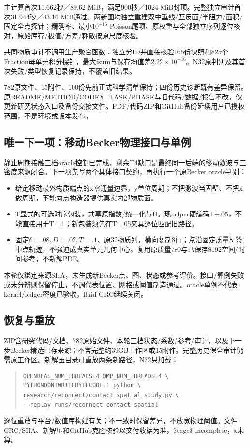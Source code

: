 \documentclass[11pt,a4paper]{article}
\begin{document}
主计算首次11.662秒／89.62 MiB，满足900秒／1024 MiB封顶。完整独立审计首次31.944秒／83.16 MiB通过。两新图均独立重建双中垂线/互反面/半阻力/面积/固定全点探针；精确率、最小$10^{-16}$ Poisson尾项、原权重与全部独立序列逐位核对，原始库存/极值/方差/耗散按原尺度核验。

共同物质审计不调用生产聚合函数：独立分ID并直接核验165份快照和825个Fraction母单元积分探针，最大fsum与保存均值差$2.22\times10^{-16}$。N32原判别及其首次失败/类型恢复记录保持，不覆盖旧结果。

782原文件、15附件、100份先前正式科学清单保持；四份历史诊断既有差异保留。原README/METHOD/CODEX\_TASK/PHASE与旧代码/数据/报告不改，仅更新研究状态入口及备份交接文件。PDF/代码ZIP和GitHub备份延续用户已授权范围，不是环境或版本发布。

\subsection*{唯一下一项：移动Becker物理接口与单例}
静止周期接触三档oracle控制已完成，剩余T4缺口是最终同一后端的移动激波与三密度来源闭合。下一项先写两个具体接口契约，再执行一个原Becker oracle判别：
\begin{itemize}
\item 给定移动最外物质端点的x零通量边界，y单位周期；不把激波当固壁、不把x做周期，不能向点构造器提供真实内部物质面。
\item T显式的可选时序包装，共享原指数/统一化与H。现helper硬编码T=.05，不能直接用于T=.1；新包装须先在T=.05夹具逐位匹配旧路径。
\item 固定$\delta=.08,D=.02,T=.1$、原32物质列，横向复制8行；点沿固定质量标签中点轨迹，不强迫成真实单元几何中心。复用原质量/c0与已保存8192空间/时间参考，不新解PDE。
\end{itemize}
本轮仅绑定来源SHA，未生成新Becker点、图、状态或参考评价。接口/算例失败或未分辨则保留停止，不调代表位置、网格或阈值制造通过。oracle单例不代表kernel/ledger密度已验收，fluid ORC继续关闭。

\subsection*{恢复与重放}
ZIP含研究代码/文档、782原始文件、本轮三档状态/系数/参考/审计，以及下一步Becker精选已存来源；不含完整约39GB工作区或15附件。完整历史保全审计仍需原工作区。新解压目录可重放两条新路径，N32只加载：
\begin{quote}\small\begin{verbatim}
OPENBLAS_NUM_THREADS=4 OMP_NUM_THREADS=4 \
PYTHONDONTWRITEBYTECODE=1 python \
research/reconnect/contact_spatial_study.py \
--replay runs/reconnect-contact-spatial
\end{verbatim}\end{quote}
逐位重放与平台/数值库构建有关；不一致时保留差异，不放宽物理阈值。文件CRC/SHA、新解压和GitHub克隆核验以交付收据为准。Stage3 incomplete，κ未算。
\end{document}
